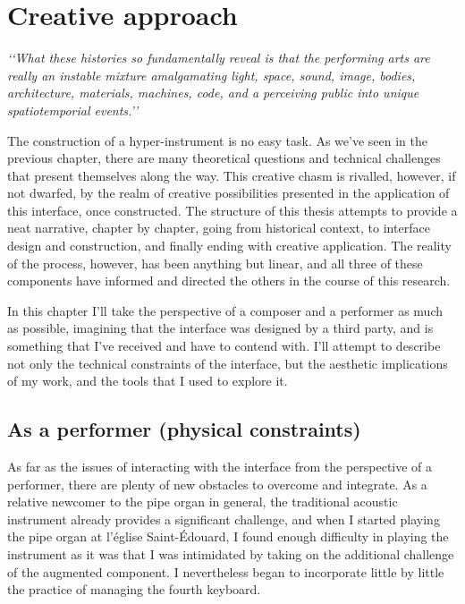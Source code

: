 \documentclass[12pt,twoside,maitrise]{dms_ks}
\theoremstyle{definition}
\begin{document}
{\chapter{Creative approach}

\epigraph{\textit{‘‘What these histories so fundamentally reveal is that the performing arts are really an instable mixture amalgamating light, space, sound, image, bodies, architecture, materials, machines, code, and a perceiving public into unique spatiotemporial events.’’}\footnotemark}{}

The construction of a hyper-instrument is no easy task.
As we've seen in the previous chapter, there are many theoretical questions and technical challenges that present themselves along the way.
This creative chasm is rivalled, however, if not dwarfed, by the realm of creative possibilities presented in the application of this interface, once constructed.
The structure of this thesis attempts to provide a neat narrative, chapter by chapter, going from historical context, to interface design and construction, and finally ending with creative application.
The reality of the process, however, has been anything but linear, and all three of these components have informed and directed the others in the course of this research.

In this chapter I’ll take the perspective of a composer and a performer as much as possible, imagining that the interface was designed by a third party, and is something that I’ve received and have to contend with.
I’ll attempt to describe not only the technical constraints of the interface, but the aesthetic implications of my work, and the tools that I used to explore it.

\section{As a performer (physical constraints)}

As far as the issues of interacting with the interface from the perspective of a performer, there are plenty of new obstacles to overcome and integrate. 
As a relative newcomer to the pipe organ in general, the traditional acoustic instrument already provides a significant challenge, and when I started playing the pipe organ at l’église Saint-Édouard, I found enough difficulty in playing the instrument as it was that I was intimidated by taking on the additional challenge of the augmented component. 
I nevertheless began to incorporate little by little the practice of managing the fourth keyboard. 

}
\end{document}
